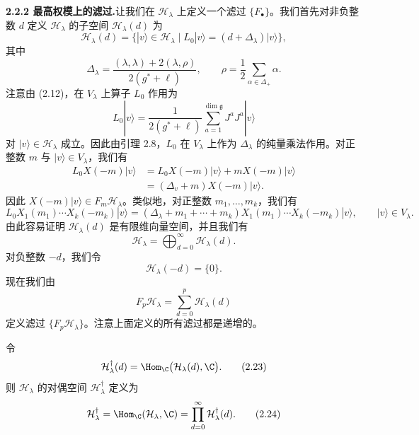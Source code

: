 \noindent\textbf{2.2.2 最高权模上的滤过.}\quad 让我们在 $\mathcal{H}_{\lambda}$ 上定义一个滤过
$\{F_{\bullet}\}$。我们首先对非负整数 $d$ 定义 $\mathcal{H}_{\lambda}$ 的子空间
$\mathcal{H}_{\lambda}(d)$ 为
\begin{equation}
\mathcal{H}_{\lambda}(d)=\{|v\rangle\in\mathcal{H}_{\lambda}\mid
L_0|v\rangle=(d+\Delta_{\lambda})|v\rangle\}, \tag{2.21}
\end{equation}
其中
\[
\Delta_{\lambda}=\frac{(\lambda,\lambda)+2(\lambda,\rho)}{2(g^*+\ell)},\qquad
\rho=\frac{1}{2}\sum_{\alpha\in\Delta_+}\alpha.
\]
注意由 (2.12)，在 $V_{\lambda}$ 上算子 $L_0$ 作用为
\[
L_0|v\rangle=\frac{1}{2(g^*+\ell)}\sum_{a=1}^{\dim\mathfrak{g}}J^{a}J^{a}|v\rangle
\]
对 $|v\rangle\in\mathcal{H}_{\lambda}$ 成立。因此由引理 2.8，$L_0$ 在 $V_{\lambda}$ 上作为
$\Delta_{\lambda}$ 的纯量乘法作用。对正整数 $m$ 与 $|v\rangle\in V_{\lambda}$，我们有
\begin{align*}
L_0X(-m)|v\rangle&=L_0X(-m)|v\rangle+mX(-m)|v\rangle\\
&=(\Delta_{v}+m)X(-m)|v\rangle.
\end{align*}
因此 $X(-m)|v\rangle\in F_m\mathcal{H}_{\lambda}$。类似地，对正整数 $m_1,\dots,m_k$，我们有
\[
L_0X_1(m_1)\cdots X_k(-m_k)|v\rangle
=(\Delta_{\lambda}+m_1+\cdots+m_k)X_1(m_1)\cdots X_k(-m_k)|v\rangle,
\qquad |v\rangle\in V_{\lambda}.
\]
由此容易证明 $\mathcal{H}_{\lambda}(d)$ 是有限维向量空间，并且我们有
\[
\mathcal{H}_{\lambda}=\bigoplus_{d=0}^{\infty}\mathcal{H}_{\lambda}(d).
\]
对负整数 $-d$，我们令
\[
\mathcal{H}_{\lambda}(-d)=\{0\}.
\]
现在我们由
\begin{equation}
F_p\mathcal{H}_{\lambda}=\sum_{d=0}^{p}\mathcal{H}_{\lambda}(d) \tag{2.22}
\end{equation}
定义滤过 $\{F_p\mathcal{H}_{\lambda}\}$。注意上面定义的所有滤过都是递增的。

令
\begin{equation}
\mathcal{H}^{\dagger}_{\lambda}(d)=\Hom_{\C}\big(\mathcal{H}_{\lambda}(d),\C\big). \tag{2.23}
\end{equation}
则 $\mathcal{H}_{\lambda}$ 的对偶空间 $\mathcal{H}^{\dagger}_{\lambda}$ 定义为
\begin{equation}
\mathcal{H}^{\dagger}_{\lambda}=\Hom_{\C}(\mathcal{H}_{\lambda},\C)
=\prod_{d=0}^{\infty}\mathcal{H}^{\dagger}_{\lambda}(d). \tag{2.24}
\end{equation}

